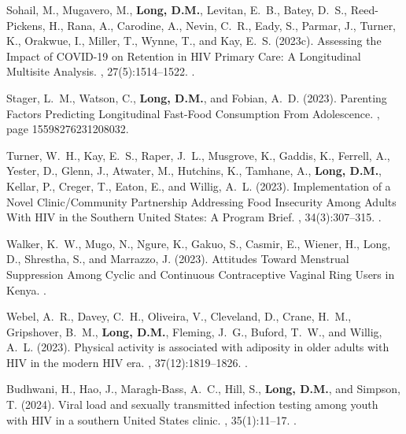 \begin{thebibliography}{}
Sohail, M., Mugavero, M., \textbf{Long, D.M.}, Levitan, E.~B., Batey, D.~S., Reed-Pickens,
  H., Rana, A., Carodine, A., Nevin, C.~R., Eady, S., Parmar, J., Turner, K.,
  Orakwue, I., Miller, T., Wynne, T., and Kay, E.~S. (2023c).
\newblock Assessing the {Impact} of {COVID}-19 on {Retention} in {HIV}
  {Primary} {Care}: {A} {Longitudinal} {Multisite} {Analysis}.
, 27(5):1514--1522.
.  


Stager, L.~M., Watson, C., \textbf{Long, D.M.}, and Fobian, A.~D. (2023).
\newblock Parenting {Factors} {Predicting} {Longitudinal} {Fast}-{Food}
  {Consumption} {From} {Adolescence}.
, page 15598276231208032.


Turner, W.~H., Kay, E.~S., Raper, J.~L., Musgrove, K., Gaddis, K., Ferrell, A.,
  Yester, D., Glenn, J., Atwater, M., Hutchins, K., Tamhane, A., \textbf{Long, D.M.},
  Kellar, P., Creger, T., Eaton, E., and Willig, A.~L. (2023).
\newblock Implementation of a {Novel} {Clinic}/{Community} {Partnership}
  {Addressing} {Food} {Insecurity} {Among} {Adults} {With} {HIV} in the
  {Southern} {United} {States}: {A} {Program} {Brief}.
,
  34(3):307--315.
.   


Walker, K.~W., Mugo, N., Ngure, K., Gakuo, S., Casmir, E., Wiener, H., Long,
  D., Shrestha, S., and Marrazzo, J. (2023).
\newblock Attitudes {Toward} {Menstrual} {Suppression} {Among} {Cyclic} and
  {Continuous} {Contraceptive} {Vaginal} {Ring} {Users} in {Kenya}.
.

Webel, A.~R., Davey, C.~H., Oliveira, V., Cleveland, D., Crane, H.~M.,
  Gripshover, B.~M., \textbf{Long, D.M.}, Fleming, J.~G., Buford, T.~W., and Willig,
  A.~L. (2023).
\newblock Physical activity is associated with adiposity in older adults with
  {HIV} in the modern {HIV} era.
, 37(12):1819--1826.
.  


Budhwani, H., Hao, J., Maragh-Bass, A.~C., Hill, S., \textbf{Long, D.M.}, and Simpson,
  T. (2024).
\newblock Viral load and sexually transmitted infection testing among youth
  with {HIV} in a southern {United} {States} clinic.
, 35(1):11--17.
.   



\end{thebibliography}
